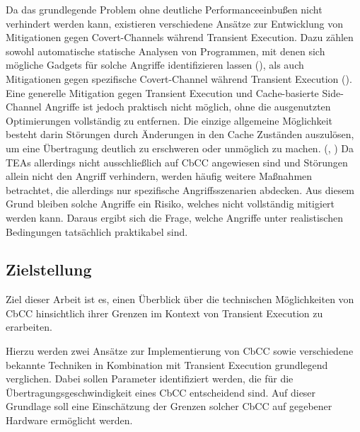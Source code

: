 Da das grundlegende Problem ohne
deutliche Performanceeinbußen nicht verhindert werden kann,
existieren verschiedene Ansätze zur Entwicklung von Mitigationen
gegen Covert-Channels während Transient Execution. Dazu zählen
sowohl automatische statische Analysen von Programmen, mit denen
sich mögliche Gadgets für solche Angriffe identifizieren lassen
(\cite{brotzman_specsafe_2021}),
als auch Mitigationen gegen spezifische Covert-Channel während
Transient Execution
(\cite{cheng_speclfb_2024}).
Eine generelle Mitigation gegen Transient Execution und
Cache-basierte Side-Channel Angriffe ist jedoch praktisch nicht
möglich, ohne die ausgenutzten Optimierungen vollständig zu
entfernen. Die einzige allgemeine Möglichkeit besteht darin
Störungen durch Änderungen in den Cache Zuständen auszulösen,
um eine Übertragung deutlich zu erschweren oder unmöglich zu machen.
(\cite[6]{wang_covert_2006}, \cite[11]{su_survey_2021})
Da \acp{TEA} allerdings nicht ausschließlich auf
\ac{CbCC} angewiesen sind und Störungen allein nicht den Angriff
verhindern, werden häufig weitere Maßnahmen betrachtet, die
allerdings nur spezifische Angriffsszenarien abdecken.
Aus diesem Grund bleiben solche Angriffe ein Risiko,
welches nicht vollständig mitigiert werden kann. Daraus ergibt
sich die Frage, welche Angriffe unter realistischen Bedingungen
tatsächlich praktikabel sind.

\subsection{Zielstellung}
Ziel dieser Arbeit ist es, einen Überblick über
die technischen Möglichkeiten von \ac{CbCC} hinsichtlich ihrer
Grenzen im Kontext von Transient Execution zu erarbeiten.

Hierzu werden zwei Ansätze zur Implementierung von CbCC sowie
verschiedene bekannte Techniken in Kombination mit Transient
Execution grundlegend verglichen. Dabei sollen
Parameter identifiziert werden, die für die
Übertragungsgeschwindigkeit eines CbCC entscheidend sind. Auf
dieser Grundlage soll eine Einschätzung der Grenzen solcher
CbCC auf gegebener Hardware ermöglicht werden.
